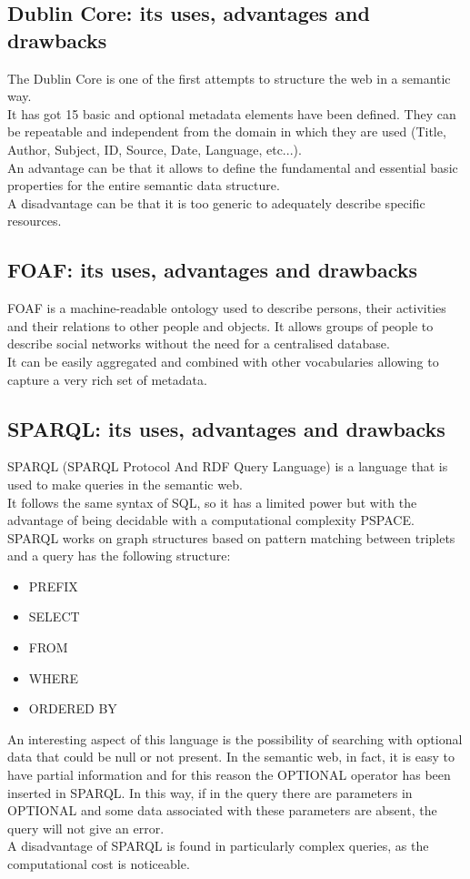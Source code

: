 \subsection{Dublin Core: its uses, advantages and drawbacks}
The Dublin Core is one of the first attempts to structure the web
in a semantic way.\\
It has got 15 basic and optional metadata elements have been defined.
They can be repeatable and independent from the domain in which they
are used (Title, Author, Subject, ID, Source, Date, Language, etc...).\\
An advantage can be that it allows to define the fundamental and
essential basic properties for the entire semantic data structure.\\
A disadvantage can be that it is too generic to adequately describe
specific resources.

\subsection{FOAF: its uses, advantages and drawbacks}
FOAF is a machine-readable ontology used to describe persons,
their activities and their relations to other people and objects.
It allows groups of people to describe social networks without
the need for a centralised database.\\
It can be easily aggregated and combined
with other vocabularies allowing to capture a very rich set of metadata.

\subsection{SPARQL: its uses, advantages and drawbacks}
SPARQL (SPARQL Protocol And RDF Query Language) is a language that
is used to make queries in the semantic web.\\
It follows the same syntax of SQL, so it has a limited power but with
the advantage of being decidable with a computational complexity PSPACE.\\
SPARQL works on graph structures based on pattern matching between
triplets and a query has the following structure:
\begin{itemize}
    \item PREFIX
    \item SELECT
    \item FROM
    \item WHERE
    \item ORDERED BY
\end{itemize}
An interesting aspect of this language is the possibility of searching
with optional data that could be null or not present.
In the semantic web, in fact, it is easy to have partial information
and for this reason the OPTIONAL operator has been inserted in SPARQL.
In this way, if in the query there are parameters in OPTIONAL and some
data associated with these parameters are
absent, the query will not give an error.\\
A disadvantage of SPARQL is found in particularly complex queries,
as the computational cost is noticeable.

